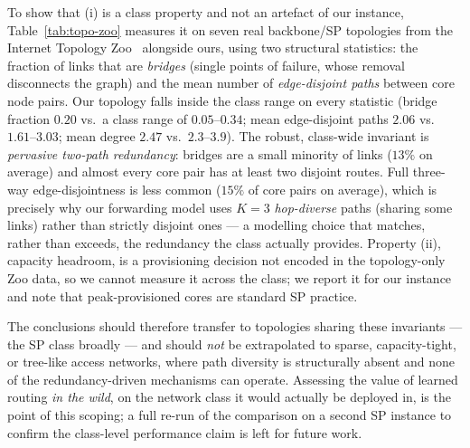 \documentclass[10pt,journal,comsoc]{IEEEtran}
\begin{document}
To show that (i) is a class property and not an artefact of our instance, Table~\ref{tab:topo-zoo} measures it on seven real backbone/SP topologies from the Internet Topology Zoo~\cite{knight2011internet} alongside ours, using two structural statistics: the fraction of links that are \emph{bridges} (single points of failure, whose removal disconnects the graph) and the mean number of \emph{edge-disjoint paths} between core node pairs. Our topology falls inside the class range on every statistic (bridge fraction $0.20$ vs.\ a class range of $0.05$--$0.34$; mean edge-disjoint paths $2.06$ vs.\ $1.61$--$3.03$; mean degree $2.47$ vs.\ $2.3$--$3.9$). The robust, class-wide invariant is \emph{pervasive two-path redundancy}: bridges are a small minority of links ($13\%$ on average) and almost every core pair has at least two disjoint routes. Full three-way edge-disjointness is less common ($15\%$ of core pairs on average), which is precisely why our forwarding model uses $K{=}3$ \emph{hop-diverse} paths (sharing some links) rather than strictly disjoint ones --- a modelling choice that matches, rather than exceeds, the redundancy the class actually provides. Property (ii), capacity headroom, is a provisioning decision not encoded in the topology-only Zoo data, so we cannot measure it across the class; we report it for our instance and note that peak-provisioned cores are standard SP practice.

The conclusions should therefore transfer to topologies sharing these invariants --- the SP class broadly --- and should \emph{not} be extrapolated to sparse, capacity-tight, or tree-like access networks, where path diversity is structurally absent and none of the redundancy-driven mechanisms can operate. Assessing the value of learned routing \emph{in the wild}, on the network class it would actually be deployed in, is the point of this scoping; a full re-run of the comparison on a second SP instance to confirm the class-level performance claim is left for future work.
\end{document}
